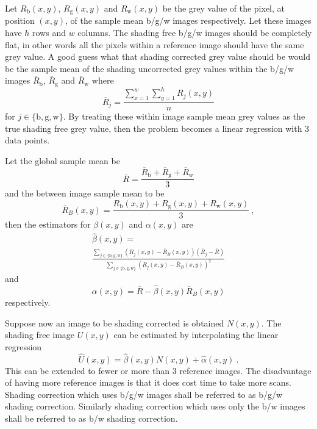 \documentclass[a4paper]{proc}
\begin{document}
Let $R_\text{b}(x,y)$, $R_\text{g}(x,y)$ and $R_\text{w}(x,y)$ be the grey value of the pixel, at position $(x,y)$, of the sample mean b/g/w images respectively. Let these images have $h$ rows and $w$ columns. The shading free b/g/w images should be completely flat, in other words all the pixels within a reference image should have the same grey value. A good guess what that shading corrected grey value should be would be the sample mean of the shading uncorrected grey values within the b/g/w images $\overline{R}_\text{b}$, $\overline{R}_\text{g}$ and $\overline{R}_\text{w}$ where
\begin{equation}
\overline{R}_j=\frac{\sum_{x=1}^w\sum_{y=1}^hR_j(x,y)}{n}
\end{equation}
for $j\in\{\text{b},\text{g},\text{w}\}$. By treating these within image sample mean grey values as the true shading free grey value, then the problem becomes a linear regression with 3 data points.

Let the global sample mean be
\begin{equation}
\overline{R}=\frac{\overline{R}_\text{b} + \overline{R}_\text{g} + \overline{R}_\text{w}}{3}
\end{equation}
and the between image sample mean to be
\begin{equation}
\overline{R}_B(x,y)=\frac{R_\text{b}(x,y) + R_\text{g}(x,y) + R_\text{w}(x,y)}{3} \ ,
\end{equation}
then the estimators for $\beta(x,y)$ and $\alpha(x,y)$ are
\begin{multline}
\widehat{\beta}(x,y)=
\\
\frac{\sum_{j\in\{\text{b},\text{g},\text{w}\}}\left(R_j(x,y)-\overline{R}_B(x,y)\right)\left(\overline{R}_j-\overline{R}\right)}{\sum_{j\in\{\text{b},\text{g},\text{w}\}}\left(R_j(x,y)-\overline{R}_B(x,y)\right)^2}
\end{multline}
and
\begin{equation}
\widehat{\alpha}(x,y) = \overline{R}-\widehat{\beta}(x,y)\overline{R}_B(x,y) 
\end{equation}
respectively.

Suppose now an image to be shading corrected is obtained $N(x,y)$. The shading free image $U(x,y)$ can be estimated by interpolating the linear regression
\begin{equation}
\widehat{U}(x,y) = \widehat{\beta}(x,y)N(x,y)+\widehat{\alpha}(x,y) \ .
\end{equation}
This can be extended to fewer or more than 3 reference images. The disadvantage of having more reference images is that it does cost time to take more scans. Shading correction which uses b/g/w images shall be referred to as b/g/w shading correction. Similarly shading correction which uses only the b/w images shall be referred to as b/w shading correction.
\end{document}
